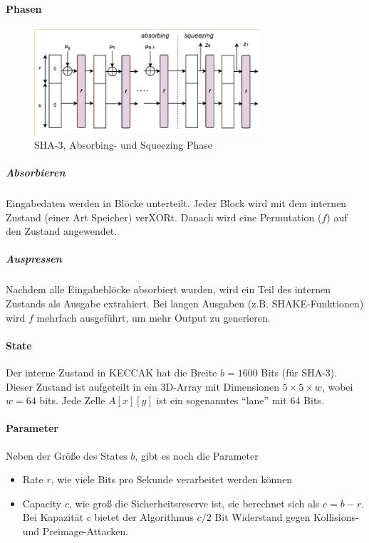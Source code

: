 \paragraph{Phasen}

\begin{figure}[h]
    \includegraphics[width=0.75\textwidth]{figures/fig11-sponge}
    \centering
    \caption{SHA-3, Absorbing- und Squeezing Phase}
\end{figure}

\subparagraph{Absorbieren} Eingabedaten werden in Blöcke unterteilt.
Jeder Block wird mit dem internen Zustand (einer Art Speicher) verXORt.
Danach wird eine Permutation ($f$) auf den Zustand angewendet.

\subparagraph{Auspressen} Nachdem alle Eingabeblöcke
absorbiert wurden, wird ein Teil des internen Zustands als Ausgabe extrahiert.
Bei langen Ausgaben (z.B. SHAKE-Funktionen) wird $f$ mehrfach ausgeführt, um mehr Output zu generieren.

\paragraph{State} Der interne Zustand in KECCAK hat die Breite $b=1600$ Bits (für SHA-3). Dieser Zustand ist aufgeteilt in ein 3D-Array mit
Dimensionen $5 \times 5 \times w$, wobei $w = 64$ bits. Jede Zelle $A[x][y]$ ist ein sogenanntes ``lane'' mit 64 Bits. 

\paragraph{Parameter}

Neben der Größe des States $b$, gibt es noch die Parameter

\begin{itemize}
    \item Rate $r$, wie viele Bits pro Sekunde verarbeitet werden können 
    \item Capacity $c$, wie groß die Sicherheitsreserve ist, sie berechnet sich als $c = b - r$. Bei Kapazität $c$  bietet der Algorithmus $c/2$ Bit Widerstand gegen 
    Kollisions- und Preimage-Attacken. 
\end{itemize}

